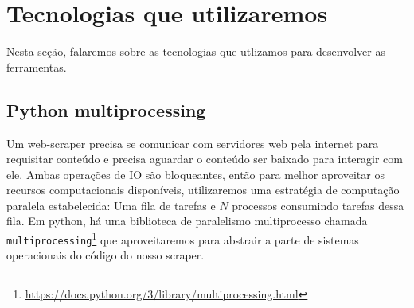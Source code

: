 
\section{Tecnologias que utilizaremos}

Nesta seção, falaremos sobre as tecnologias que utlizamos para desenvolver as ferramentas.

\subsection{Python multiprocessing}

Um web-scraper precisa se comunicar com servidores web pela internet para requisitar conteúdo e precisa aguardar o conteúdo ser baixado para interagir com ele.
Ambas operações de IO são bloqueantes, então para melhor aproveitar os recursos computacionais disponíveis, utilizaremos uma estratégia de computação paralela estabelecida: Uma fila de tarefas e $N$ processos consumindo tarefas dessa fila.
Em python, há uma biblioteca de paralelismo multiprocesso chamada \texttt{multiprocessing}\footnote{\url{https://docs.python.org/3/library/multiprocessing.html}} que aproveitaremos para abstrair a parte de sistemas operacionais do código do nosso scraper.

